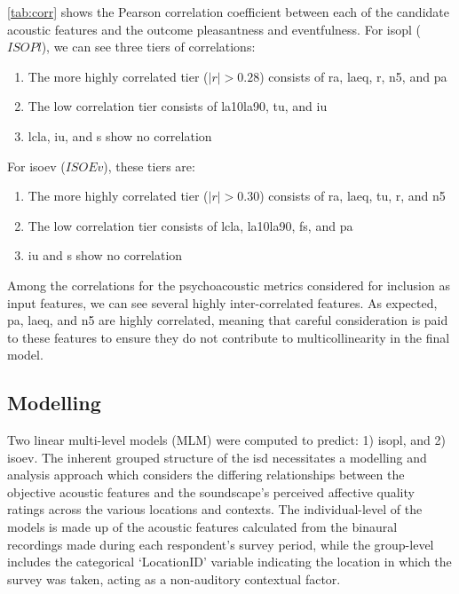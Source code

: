    \cref{tab:corr} shows the Pearson correlation coefficient between each of the candidate acoustic features and the outcome pleasantness and eventfulness. For \gls{isopl} ($ISOPl$), we can see three tiers of correlations:

   \begin{enumerate}
     \item The more highly correlated tier ($|r| > 0.28$) consists of \gls{ra}, \gls{laeq}, \gls{r}, \gls{n5}, and \gls{pa}
     \item The low correlation tier consists of \gls{la10la90}, \gls{tu}, and \gls{iu}
     \item \gls{lcla}, \gls{iu}, and \gls{s} show no correlation
   \end{enumerate}

   For \gls{isoev} ($ISOEv$), these tiers are:
   \begin{enumerate}
     \item The more highly correlated tier ($|r| > 0.30$) consists of \gls{ra}, \gls{laeq}, \gls{tu}, \gls{r}, and \gls{n5}
     \item The low correlation tier consists of \gls{lcla}, \gls{la10la90}, \gls{fs}, and \gls{pa}
     \item \gls{iu} and \gls{s} show no correlation
   \end{enumerate}

   Among the correlations for the psychoacoustic metrics considered for inclusion as input features, we can see several highly inter-correlated features. As expected, \gls{pa}, \gls{laeq}, and \gls{n5} are highly correlated, meaning that careful consideration is paid to these features to ensure they do not contribute to multicollinearity in the final model.





 \subsection{Modelling}

   Two linear multi-level models (MLM) were computed to predict: 1) \gls{isopl}, and 2) \gls{isoev}. The inherent grouped structure of the \gls{isd} necessitates a modelling and analysis approach which considers the differing relationships between the objective acoustic features and the soundscape's perceived affective quality ratings across the various locations and contexts. The individual-level of the models is made up of the acoustic features calculated from the binaural recordings made during each respondent's survey period, while the group-level includes the categorical `LocationID' variable indicating the location in which the survey was taken, acting as a non-auditory contextual factor.

